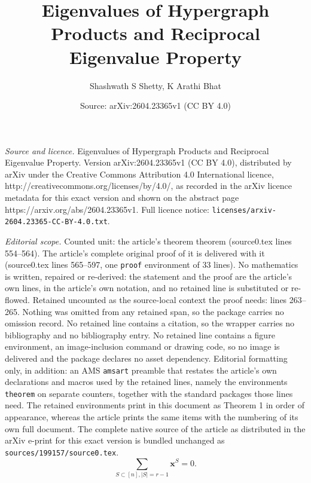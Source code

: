 \documentclass[10pt,a4paper]{amsart}
\title{Eigenvalues of Hypergraph Products and Reciprocal Eigenvalue Property}
\author{Shashwath S Shetty, K Arathi Bhat}
\date{Source: arXiv:2604.23365v1 (CC BY 4.0)}
\begin{document}
\maketitle

\noindent\emph{Source and licence.} Eigenvalues of Hypergraph Products and Reciprocal Eigenvalue Property. Version arXiv:2604.23365v1 (CC BY 4.0), distributed by arXiv under the Creative Commons Attribution 4.0 International licence, http://creativecommons.org/licenses/by/4.0/, as recorded in the arXiv licence metadata for this exact version and shown on the abstract page https://arxiv.org/abs/2604.23365v1. Full licence notice: \texttt{licenses/arxiv-2604.23365-CC-BY-4.0.txt}.\par\smallskip

\noindent\textit{Editorial scope.} Counted unit: the article's theorem theorem (source0.tex lines 554--564). The article's complete original proof of it is delivered with it (source0.tex lines 565--597, one \texttt{proof} environment of 33 lines). No mathematics is written, repaired or re-derived: the statement and the proof are the article's own lines, in the article's own notation, and no retained line is substituted or re-flowed.  Retained uncounted as the source-local context the proof needs: lines 263--265.  Nothing was omitted from any retained span, so the package carries no omission record.  No retained line contains a citation, so the wrapper carries no bibliography and no bibliography entry.  No retained line contains a figure environment, an image-inclusion command or drawing code, so no image is delivered and the package declares no asset dependency.  Editorial formatting only, in addition: an AMS \texttt{amsart} preamble that restates the article's own declarations and macros used by the retained lines, namely the environments \texttt{theorem} on separate counters, together with the standard packages those lines need.  The retained environments print in this document as Theorem 1 in order of appearance, whereas the article prints the same items with the numbering of its own full document.  The complete native source of the article as distributed in the arXiv e-print for this exact version is bundled unchanged as \texttt{sources/199157/source0.tex}.
		\begin{equation}\label{non-main_condition}
			\sum\limits_{S \subset [n], |S|=r-1} \mathbf{x}^S = 0.
		\end{equation}
\end{document}
